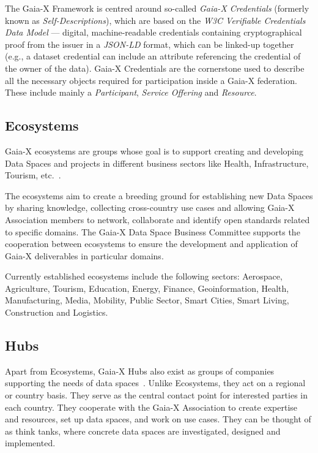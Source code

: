 The Gaia-X Framework is centred around so-called \textit{Gaia-X Credentials} (formerly known as \textit{Self-Descriptions}), which are based on the \textit{W3C Verifiable Credentials Data Model} --- digital, machine-readable credentials containing cryptographical proof from the issuer in a \textit{JSON-LD} format, which can be linked-up together (e.g., a dataset credential can include an attribute referencing the credential of the owner of the data).
Gaia-X Credentials are the cornerstone used to describe all the necessary objects required for participation inside a Gaia-X federation.
These include mainly a \textit{Participant}, \textit{Service Offering} and \textit{Resource}.

\subsection{Ecosystems}\label{subsec:ecosystems}

Gaia-X ecosystems are groups whose goal is to support creating and developing Data Spaces and projects in different business sectors like Health, Infrastructure, Tourism, etc.~\cite{gaiax}. %

The ecosystems aim to create a breeding ground for establishing new Data Spaces by sharing knowledge, collecting cross-country use cases and allowing Gaia-X Association members to network, collaborate and identify open standards related to specific domains.
The Gaia-X Data Space Business Committee supports the cooperation between ecosystems to ensure the development and application of Gaia-X deliverables in particular domains.

Currently established ecosystems include the following sectors: Aerospace, Agriculture, Tourism, Education, Energy, Finance, Geoinformation, Health, Manufacturing, Media, Mobility, Public Sector, Smart Cities, Smart Living, Construction and Logistics.

\subsection{Hubs}\label{subsec:hubs}

Apart from Ecosystems, Gaia-X Hubs also exist as groups of companies supporting the needs of data spaces~\cite{gaiax}.
Unlike Ecosystems, they act on a regional or country basis.
They serve as the central contact point for interested parties in each country.
They cooperate with the Gaia-X Association to create expertise and resources, set up data spaces, and work on use cases.
They can be thought of as think tanks, where concrete data spaces are investigated, designed and implemented.

